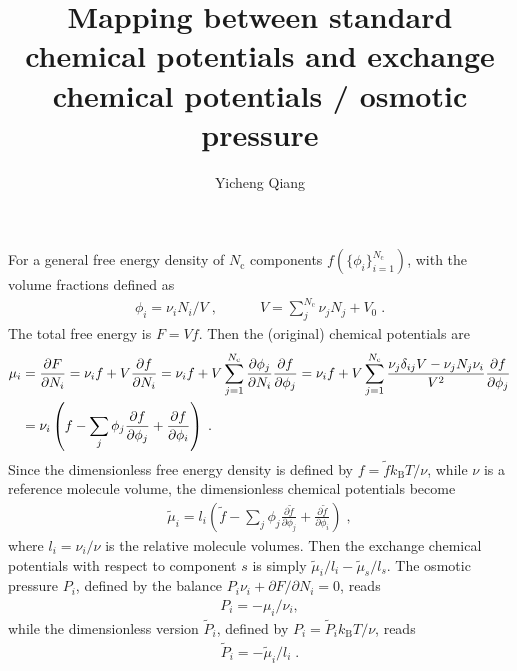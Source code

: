 \documentclass[reprint,onecolumn,groupedaddress,amsmath,amssymb]{revtex4-2}
\begin{document}
\title{Mapping between standard chemical potentials and exchange chemical potentials / osmotic pressure}

\author{Yicheng Qiang}

\maketitle

For a general free energy density of $N_\mathrm{c}$ components $f(\{\phi_i\}_{i=1}^{N_\mathrm{c}})$, with the volume fractions defined as
\begin{align}
    \phi_i = \nu_i  N_i / V\;, \quad \quad \quad V = \sum_j^{N_\mathrm{c}} \nu_j N_j + V_0 \;.
\end{align}
The total free energy is $F = V f$.
Then the (original) chemical potentials are
\begin{align}
    \mu_i 
    &= \frac{\partial F}{\partial N_i}
    = \nu_i f + V \frac{\partial f}{\partial N_i}
    = \nu_i f + V \sum_{j=1}^{N_\mathrm{c}} \frac{\partial \phi_j}{\partial N_i} \frac{\partial f}{\partial \phi_j}
    = \nu_i f + V \sum_{j=1}^{N_\mathrm{c}} \frac{\nu_j \delta_{ij} V - \nu_j N_j \nu_i}{V^2} \frac{\partial f}{\partial \phi_j} \notag \\
    &= \nu_i \left( f - \sum_j \phi_j \frac{\partial f}{\partial \phi_j} + \frac{\partial f}{\partial \phi_i} \right) \;.
\end{align}
Since the dimensionless free energy density is defined by $f = \tilde{f} k_\mathrm{B} T / \nu$, while $\nu$ is a reference molecule volume, the dimensionless chemical potentials become
\begin{align}
    \tilde{\mu}_i = l_i \left(\tilde{f} - \sum_j \phi_j \frac{\partial \tilde{f}}{\partial \phi_j} + \frac{\partial \tilde{f}}{\partial \phi_i} \right) \;,
\end{align} 
where $l_i = \nu_i / \nu$ is the relative molecule volumes.
Then the exchange chemical potentials with respect to component $s$ is simply $\tilde{\mu}_i/l_i - \tilde{\mu}_s/l_s$.
The osmotic pressure $P_i$, defined by the balance $P_i \nu_i + \partial F/\partial N_i = 0$, reads
\begin{align}
    P_i = - \mu_i / \nu_i, 
\end{align} 
while the dimensionless version $\tilde{P}_i$, defined by $P_i = \tilde{P}_i k_\mathrm{B} T / \nu$, reads
\begin{align}
    \tilde{P}_i = - \tilde{\mu}_i / l_i \;.
\end{align}
\end{document}
